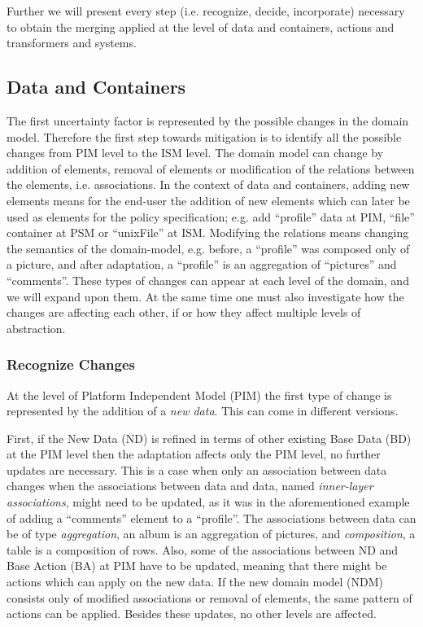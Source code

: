 \documentclass{sig-alternate}
\begin{document}
Further we will present every step (i.e. recognize, decide, incorporate) necessary to obtain the merging applied at the level of data and containers, actions and transformers and systems.


\subsection{Data and Containers}
The first uncertainty factor is represented by the possible changes in the domain model.
Therefore the first step towards mitigation is to identify all the possible changes from PIM level to the ISM level.
The domain model can change by addition of elements, removal of elements or modification of the relations between the elements, i.e. associations.
In the context of data and containers, adding new elements means for the end-user the addition of new elements which can later be used as elements for the policy specification; 
e.g. add ``profile'' data at PIM, ``file'' container at PSM or ``unixFile'' at ISM.
Modifying the relations means changing the semantics of the domain-model,
e.g. before, a ``profile'' was composed only of a picture, and after adaptation, a ``profile'' is an aggregation of ``pictures'' and ``comments''.
These types of changes can appear at each level of the domain, and we will expand upon them.
At the same time one must also investigate how the changes are affecting each other, if or how they affect multiple levels of abstraction.

\subsubsection{Recognize Changes}

At the level of Platform Independent Model (PIM) the first type of change is represented by the addition of a \textit{new data}.
This can come in different versions. 

First, if the New Data (ND) is refined in terms of other existing Base Data (BD) at the PIM level then the adaptation affects only the PIM level, no further updates are necessary.
This is a case when only an association between data changes
when the associations between data and data, named \textit{inner-layer associations}, might need to be updated,
as it was in the aforementioned example of adding a ``comments'' element to a ``profile''.
The associations between data can be of type \textit{aggregation}, an album is an aggregation of pictures, and \textit{composition}, a table is a composition of rows.
Also, some of the associations between ND and Base Action (BA) at PIM have to be updated, meaning that there might be actions which can apply on the new data.
If the new domain model (NDM) consists only of modified associations or removal of elements, the same pattern of actions can be applied.
Besides these updates, no other levels are affected.
\end{document}
